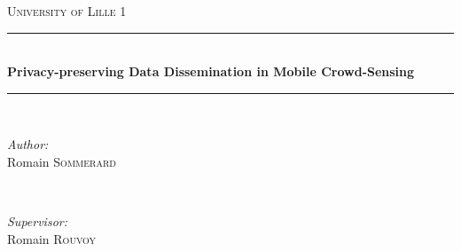 	
	\begin{titlepage}
		
		\newcommand{\HRule}{\rule{\linewidth}{0.5mm}} %
		
		\center %
		
		
		\textsc{\LARGE University of Lille 1}\\[1.5cm] %
		
		
		\HRule \\[0.4cm]
		\huge \bfseries Privacy-preserving Data Dissemination in Mobile Crowd-Sensing\\[0.4cm] %
		\HRule \\[1.5cm]
		
		
		\begin{minipage}{0.4\textwidth}
			\begin{flushleft} \large
				\emph{Author:}\\
				Romain \textsc{Sommerard} %
			\end{flushleft}
		\end{minipage}
		~
		\begin{minipage}{0.4\textwidth}
			\begin{flushright} \large
				\emph{Supervisor:} \\
				Romain \textsc{Rouvoy} %
			\end{flushright}
		\end{minipage}\\[2cm]
		

\end{titlepage}
